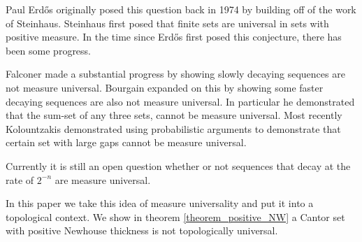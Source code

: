 Paul Erd\H{o}s originally posed this question back in 1974 by building off of the work of Steinhaus.  Steinhaus\cite{Steinhaus} first posed that finite sets are universal in sets with positive measure.   In the time since Erd\H{o}s first posed this conjecture, there has been some progress.

Falconer \cite{Falconer} made a substantial progress by showing slowly decaying sequences are not measure universal.  Bourgain \cite{Bourgain} expanded on this by showing some faster decaying sequences are also not measure universal.  In particular he demonstrated that the sum-set of any three sets, cannot be measure universal.  Most recently Kolountzakis \cite{Kolo} demonstrated using probabilistic arguments to demonstrate that certain set with large gaps cannot be measure universal.  

Currently it is still an open question whether or not sequences that decay at the rate of $2^{-n}$ are measure universal. 


In this paper we take this idea of measure universality and put it into a topological context.  We show in theorem \ref{theorem_positive_NW} a Cantor set with positive Newhouse thickness is not topologically universal.



